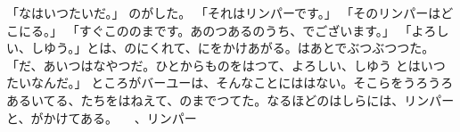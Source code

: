 \documentclass[a4paper,
tate,
book]
{jlreq}
\begin{document}
「なはいつたいだ。」
  のがした。
「それはリンパーです。」
「そのリンパーはどこにる。」
「すぐこののまです。あのつあるのうち、でございます。」
「よろしい、しゆう。」とは、のにくれて、にをかけあがる。はあとでぶつぶつつた。
「だ、あいつはなやつだ。ひとからものをはつて、よろしい、しゆう  とはいつたいなんだ。」
  ところがバーユーは、そんなことにははない。そこらをうろうろあるいてる、たちをはねえて、のまでつてた。なるほどのはしらには、リンパーと、がかけてある。 
            、リンパー
\end{document}

